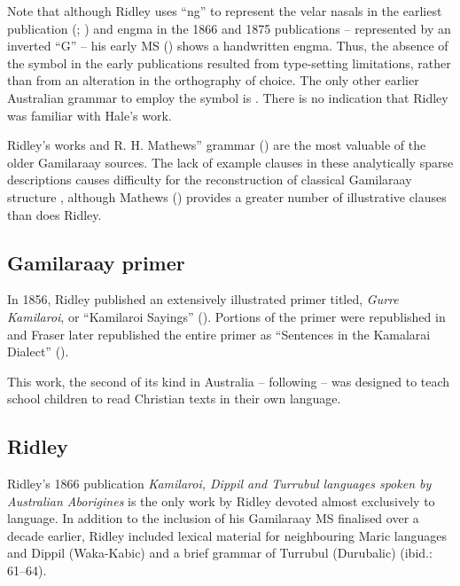Note that although Ridley uses “ng” to represent the velar nasals in the earliest publication (\citeyear{ridley_kamilaroi_1855-1}; \citeyear{ridley_kamilaroi_1856}) and engma in the 1866 and 1875 publications – represented by an inverted “G” – his early MS (\citeyear{ridley_kamilaroi_1855}) shows a handwritten engma. Thus, the absence of the symbol in the early publications resulted from type-setting limitations, rather than from an alteration in the orthography of choice. The only other earlier Australian grammar to employ the symbol is \citet{hale_languages_1846}. There is no indication that Ridley was familiar with Hale’s work.

Ridley’s works and R. H. Mathews” grammar (\citeyear{mathews_languages_1903}) are the most valuable of the older Gamilaraay sources. The lack of example clauses in these analytically sparse descriptions causes difficulty for the reconstruction of classical Gamilaraay structure \citep[5]{Giacon2014}, although Mathews (\citeyear{mathews_languages_1903}) provides a greater number of illustrative clauses than does Ridley.

\subsection{Gamilaraay primer \citeyearpar{ridley_kamilaroi_1856}}
\label{sec:key:4.5.1}

In 1856, Ridley published an extensively illustrated primer titled, \textit{Gurre Kamilaroi}, or ``Kamilaroi Sayings'' (\citeyear{ridley_kamilaroi_1856}). Portions of the primer were republished in \citet[31--33]{ridley_kamilaroi_1866} and Fraser later republished the entire primer as “Sentences in the Kamalarai Dialect” (\citeyear[Appendix F: 127--131]{ridley_gurre_1892}). 

This work, the second of its kind in Australia – following \citet{threlkeld_australian_1836} – was designed to teach school children to read Christian texts in their own language. 

\subsection{Ridley \citeyearpar{ridley_kamilaroi_1866}}
\label{sec:key:4.5.2}

Ridley’s 1866 publication \textit{Kamilaroi, Dippil and Turrubul languages spoken by Australian Aborigines} is the only work by Ridley devoted almost exclusively to language. In addition to the inclusion of his Gamilaraay MS finalised over a decade earlier, Ridley included lexical material for neighbouring Maric languages and Dippil (Waka-Kabic) and a brief grammar of Turrubul (Durubalic) (ibid.: 61--64). 

